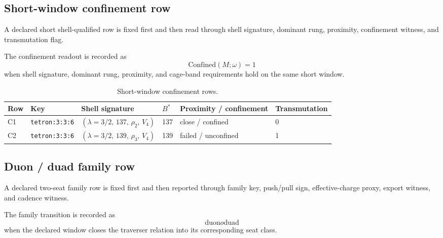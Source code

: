 \subsection{Short-window confinement row}
\label{man:short-window-confinement-row}
A declared short shell-qualified row is fixed first and then read through shell signature, dominant rung, proximity, confinement witness, and transmutation flag.\par\smallskip
{}

The confinement readout is recorded as
\[
\mathrm{Confined}(M;\omega)=1
\]
when shell signature, dominant rung, proximity, and cage-band requirements hold on the same short window.

\begin{table}[H]
\centering
\caption{Short-window confinement rows.}
\label{tab:manual-short-window-confinement}
\begin{threeparttable}
\small
\begin{tabular}{@{}llllll@{}}
\toprule
Row & Key & Shell signature & $B^*$ & Proximity / confinement & Transmutation \\
\midrule
C1 & \texttt{tetron:3:3:6} & $(\lambda\!=\!3/2,\,137,\,\rho_2,\,V_4)$ & 137 & close / confined & 0 \\
C2 & \texttt{tetron:3:3:6} & $(\lambda\!=\!3/2,\,139,\,\rho_3,\,V_4)$ & 139 & failed / unconfined & 1 \\
\bottomrule
\end{tabular}
\end{threeparttable}
\end{table}

\subsection{Duon / duad family row}
\label{man:duon-duad-family-row}
A declared two-seat family row is fixed first and then reported through family key, push/pull sign, effective-charge proxy, export witness, and cadence witness.\par\smallskip
{}

The family transition is recorded as
\[
\mathrm{duon}	o\mathrm{duad}
\]
when the declared window closes the traverser relation into its corresponding seat class.

